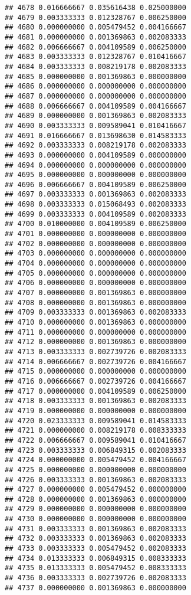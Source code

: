 \documentclass[
]{article}
\begin{document}
\begin{verbatim}
## 4678 0.016666667 0.035616438 0.025000000
## 4679 0.003333333 0.012328767 0.006250000
## 4680 0.000000000 0.005479452 0.004166667
## 4681 0.000000000 0.001369863 0.002083333
## 4682 0.006666667 0.004109589 0.006250000
## 4683 0.003333333 0.012328767 0.010416667
## 4684 0.003333333 0.008219178 0.002083333
## 4685 0.000000000 0.001369863 0.000000000
## 4686 0.000000000 0.000000000 0.000000000
## 4687 0.000000000 0.000000000 0.000000000
## 4688 0.006666667 0.004109589 0.004166667
## 4689 0.000000000 0.001369863 0.002083333
## 4690 0.003333333 0.009589041 0.010416667
## 4691 0.016666667 0.013698630 0.014583333
## 4692 0.003333333 0.008219178 0.002083333
## 4693 0.000000000 0.004109589 0.000000000
## 4694 0.000000000 0.000000000 0.000000000
## 4695 0.000000000 0.000000000 0.000000000
## 4696 0.006666667 0.004109589 0.006250000
## 4697 0.003333333 0.001369863 0.002083333
## 4698 0.003333333 0.015068493 0.002083333
## 4699 0.003333333 0.004109589 0.002083333
## 4700 0.010000000 0.004109589 0.006250000
## 4701 0.000000000 0.000000000 0.000000000
## 4702 0.000000000 0.000000000 0.000000000
## 4703 0.000000000 0.000000000 0.000000000
## 4704 0.000000000 0.000000000 0.000000000
## 4705 0.000000000 0.000000000 0.000000000
## 4706 0.000000000 0.000000000 0.000000000
## 4707 0.000000000 0.001369863 0.000000000
## 4708 0.000000000 0.001369863 0.000000000
## 4709 0.003333333 0.001369863 0.002083333
## 4710 0.000000000 0.001369863 0.000000000
## 4711 0.000000000 0.000000000 0.000000000
## 4712 0.000000000 0.001369863 0.000000000
## 4713 0.003333333 0.002739726 0.002083333
## 4714 0.006666667 0.002739726 0.004166667
## 4715 0.000000000 0.000000000 0.000000000
## 4716 0.006666667 0.002739726 0.004166667
## 4717 0.000000000 0.004109589 0.006250000
## 4718 0.003333333 0.001369863 0.002083333
## 4719 0.000000000 0.000000000 0.000000000
## 4720 0.023333333 0.009589041 0.014583333
## 4721 0.000000000 0.008219178 0.008333333
## 4722 0.006666667 0.009589041 0.010416667
## 4723 0.003333333 0.006849315 0.002083333
## 4724 0.000000000 0.005479452 0.004166667
## 4725 0.000000000 0.000000000 0.000000000
## 4726 0.003333333 0.001369863 0.002083333
## 4727 0.000000000 0.005479452 0.000000000
## 4728 0.000000000 0.001369863 0.000000000
## 4729 0.000000000 0.000000000 0.000000000
## 4730 0.000000000 0.000000000 0.000000000
## 4731 0.003333333 0.001369863 0.002083333
## 4732 0.003333333 0.001369863 0.002083333
## 4733 0.003333333 0.005479452 0.002083333
## 4734 0.013333333 0.006849315 0.008333333
## 4735 0.013333333 0.005479452 0.008333333
## 4736 0.003333333 0.002739726 0.002083333
## 4737 0.000000000 0.001369863 0.000000000

\end{verbatim}
\end{document}
